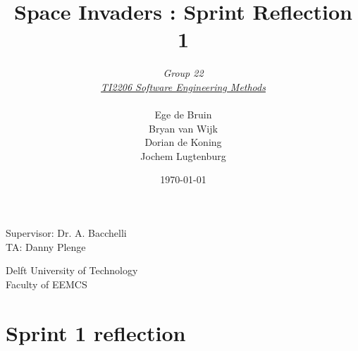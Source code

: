 \documentclass[10pt]{article}
\begin{document}
\title{Space Invaders : Sprint Reflection 1}
\date{\today}
\author{\textit{Group 22}\\ \textit{\underline{TI2206 Software Engineering Methods}} \\
 \\Ege de Bruin \\ Bryan van Wijk \\ Dorian de Koning \\ Jochem Lugtenburg }
 \maketitle  
 \begin{center}
Supervisor: Dr. A. Bacchelli\\
TA: Danny Plenge\\
 \end{center}     
 \begin{center}
 Delft University of Technology\\
 Faculty of EEMCS\\
 \end{center}
 \thispagestyle{empty}
 \pagebreak

\section*{Sprint 1 reflection}
\end{document}
